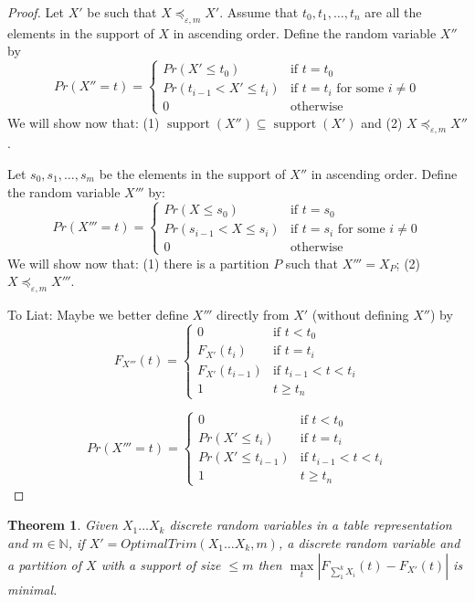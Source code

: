 \documentclass[review]{elsarticle}
\newtheorem{theorem}[lemma]{Theorem}
\DeclareMathOperator{\support}{support}
\begin{document}
\begin{proof}
Let $X'$ be such that $X \preceq_{\varepsilon,m} X'$. Assume that $t_0,t_1,\dots,t_n$ are all the elements in the support of $X$ in ascending order. Define the random variable $X''$ by 
$$
Pr(X''=t) = \begin{cases}
Pr(X' \leq t_0)           & \text{if } t=t_0  \\ 
Pr(t_{i-1} < X' \leq t_i) & \text{if } t=t_i \text{ for some } i \neq 0 \\ 
0                        & \text{otherwise}
\end{cases}
$$
We will show now that: (1) $\support(X'') \subseteq \support(X')$ and (2) $X \preceq_{\varepsilon,m} X''$. 

Let $s_0,s_1,\dots,s_m$ be the elements in the support of $X''$ in ascending order. Define the random variable $X'''$ by:
$$
Pr(X'''=t) = \begin{cases}
Pr(X \leq s_0)           & \text{if } t=s_0  \\ 
Pr(s_{i-1} < X \leq s_i) & \text{if } t=s_i \text{ for some } i \neq 0 \\ 
0                       & \text{otherwise}
\end{cases}
$$
We will show now that: (1) there is a partition $P$ such that $X'''=X_P$; (2) $X \preceq_{\varepsilon,m} X'''$. 

To Liat: Maybe we better define $X'''$ directly from $X'$ (without defining $X''$) by 
	$$F_{X'''}(t)=\begin{cases}
	  0    & \text{if } t < t_0 \\
	  F_{X'}(t_i) & \text{if } t = t_i     \\
	  F_{X'}(t_{i-1})    & \text{if } t_{i-1} < t < t_i \\
	  1               & t \geq t_n
	\end{cases}$$
	
	$$Pr(X'''=t)=\begin{cases}
	  0    & \text{if } t < t_0 \\
	  Pr(X'\leq t_i) & \text{if } t = t_i     \\
	  Pr(X' \leq t_{i-1})    & \text{if } t_{i-1} < t < t_i \\
	  1               & t \geq t_n
	\end{cases}$$
\end{proof}


\begin{theorem}
Given $X_1 \dots X_k$ discrete random variables in a table representation and $m \in \mathbb{N}$, if $X'=OptimalTrim(X_1 \dots X_k,m)$, a discrete random variable and a partition of $X$ with a support of size $\leq m$ then $\max\limits_{t}|F_{\sum_1^k X_i}(t)-F_{X'}(t)|$ is minimal.
\end{theorem}
\end{document}
